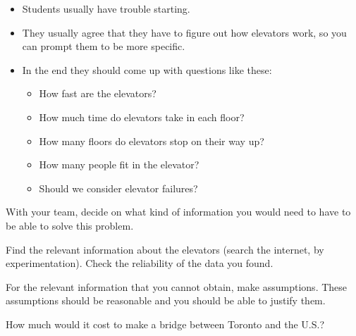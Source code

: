 \begin{annotation}
	\begin{notes}
		\begin{itemize}
			\item Students usually have trouble starting. 
			\item They usually agree that they have to figure out how elevators work, so you can prompt them to be more specific. 
			
			\item In the end they should come up with questions like these:
			\begin{itemize}
				\item How fast are the elevators?
				\item How much time do elevators take in each floor?
				\item How many floors do elevators stop on their way up?
				\item How many people fit in the elevator?
				\item Should we consider elevator failures?
			\end{itemize}
		\end{itemize}	
	\end{notes}
\end{annotation}
\begin{parts} 
	\item With your team, decide on what kind of information you would need to have to be able to solve this problem.

	\item Find the relevant information about the elevators (search the internet, by experimentation). Check the reliability of the data you found.

	\item For the relevant information that you cannot obtain, make assumptions. These assumptions should be reasonable and you should be able to justify them.
\end{parts}




\bookonlynewpage

\hfill

\bookonlynewpage

\question How much would it cost to make a bridge between Toronto and the U.S.?














